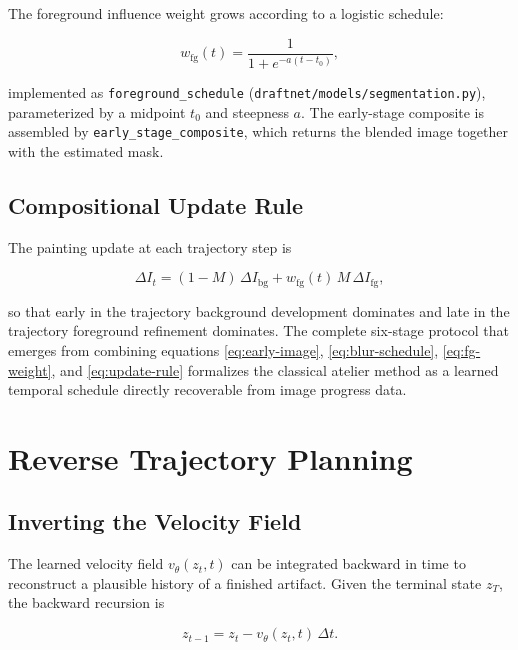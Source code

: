 \documentclass[12pt,a4paper]{article}
\theoremstyle{draftthm}
\newcommand{\vtheta}{v_{\theta}}
\newcommand{\code}[1]{\texttt{\small #1}}
\begin{document}
The foreground influence weight grows according to a logistic schedule:

\begin{equation}
  w_{\mathrm{fg}}(t) = \frac{1}{1 + e^{-a(t - t_0)}},
  \label{eq:fg-weight}
\end{equation}

implemented as \code{foreground\_schedule} (\code{draftnet/models/segmentation.py}), parameterized by a midpoint $t_0$ and steepness $a$. The early-stage composite is assembled by \code{early\_stage\_composite}, which returns the blended image together with the estimated mask.

\subsection{Compositional Update Rule}

The painting update at each trajectory step is

\begin{equation}
  \Delta I_t = (1-M)\, \Delta I_{\mathrm{bg}} + w_{\mathrm{fg}}(t)\, M\, \Delta I_{\mathrm{fg}},
  \label{eq:update-rule}
\end{equation}

so that early in the trajectory background development dominates and late in the trajectory foreground refinement dominates. The complete six-stage protocol that emerges from combining equations \eqref{eq:early-image}, \eqref{eq:blur-schedule}, \eqref{eq:fg-weight}, and \eqref{eq:update-rule} formalizes the classical atelier method as a learned temporal schedule directly recoverable from image progress data.

\section{Reverse Trajectory Planning}

\subsection{Inverting the Velocity Field}

The learned velocity field $\vtheta(z_t, t)$ can be integrated backward in time to reconstruct a plausible history of a finished artifact. Given the terminal state $z_T$, the backward recursion is

\begin{equation}
  z_{t-1} = z_t - \vtheta(z_t, t)\, \Delta t.
  \label{eq:backward-integration}
\end{equation}
\end{document}
